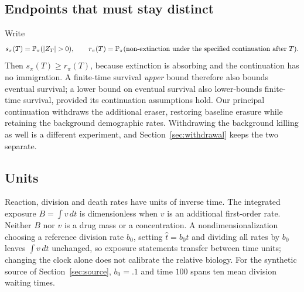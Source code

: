 \subsection{Endpoints that must stay distinct}
\label{sec:endpoints}

Write
\[
 s_\pi(T)=\Prob_\pi(|Z_T|>0),\qquad
 r_\pi(T)=\Prob_\pi(\text{non-extinction under the specified continuation
 after }T).
\]
Then $s_\pi(T)\ge r_\pi(T)$, because extinction is absorbing and the
continuation has no immigration. A finite-time survival \emph{upper} bound
therefore also bounds eventual survival; a lower bound on eventual survival also
lower-bounds finite-time survival, provided its continuation assumptions hold.
Our principal continuation withdraws the additional eraser, restoring baseline
erasure while retaining the background demographic rates. Withdrawing the
background killing as well is a different experiment, and
Section~\ref{sec:withdrawal} keeps the two separate.

\subsection{Units}
\label{sec:units}

Reaction, division and death rates have units of inverse time. The integrated
exposure $B=\int v\,dt$ is dimensionless when $v$ is an additional first-order
rate. Neither $B$ nor $v$ is a drug mass or a concentration. A
nondimensionalization choosing a reference division rate $b_0$, setting
$\hat t=b_0t$ and dividing all rates by $b_0$ leaves $\int v\,dt$ unchanged, so
exposure statements transfer between time units; changing the clock alone does
not calibrate the relative biology. For the synthetic source of
Section~\ref{sec:source}, $b_0=.1$ and time $100$ spans ten mean division
waiting times.
